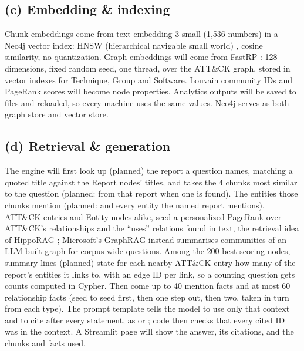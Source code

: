 \documentclass[10pt]{article}
\begin{document}
\subsection*{(c) Embedding \& indexing} Chunk embeddings come from text-embedding-3-small (1,536 numbers) in a Neo4j vector index: HNSW (hierarchical navigable small world) \cite{9}, cosine similarity, no quantization. Graph embeddings will come from FastRP \cite{7}: 128 dimensions, fixed random seed, one thread, over the ATT\&CK graph, stored in vector indexes for Technique, Group and Software. Louvain community IDs and PageRank scores will become node properties. Analytics outputs will be saved to files and reloaded, so every machine uses the same values. Neo4j serves as both graph store and vector store.

\subsection*{(d) Retrieval \& generation} The engine will first look up (planned) the report a question names, matching a quoted title against the Report nodes' titles, and takes the 4 chunks most similar to the question (planned: from that report when one is found). The entities those chunks mention (planned: and every entity the named report mentions), ATT\&CK entries and Entity nodes alike, seed a personalized PageRank \cite{6} over ATT\&CK's relationships and the ``uses'' relations found in text, the retrieval idea of HippoRAG \cite{5}; Microsoft's GraphRAG \cite{4} instead summarises communities of an LLM-built graph for corpus-wide questions. Among the 200 best-scoring nodes, summary lines (planned) state for each nearby ATT\&CK entry how many of the report's entities it links to, with an edge ID per link, so a counting question gets counts computed in Cypher. Then come up to 40 mention facts and at most 60 relationship facts (seed to seed first, then one step out, then two, taken in turn from each type). The prompt template tells the model to use only that context and to cite after every statement, as \code{[chunk:ID]} or \code{[edge:ID]}; code then checks that every cited ID was in the context. A Streamlit page will show the answer, its citations, and the chunks and facts used.
\end{document}
